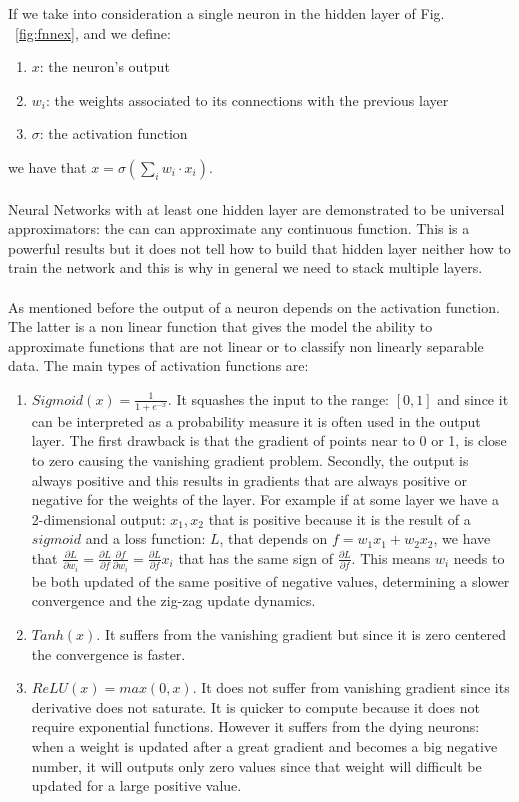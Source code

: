 \documentclass[LaM,binding=0.6cm]{sapthesis}
\begin{document}
If we take into consideration a single neuron in the hidden layer of Fig. ~\ref{fig:fnnex}, and we define:
\begin{enumerate}
\item $x$: the neuron's output 
\item $w_i$: the weights associated to its connections with the previous layer
\item $\sigma$: the activation function
\end{enumerate}
we have that $x=\sigma(\sum_i w_i\cdot x_i)$.\\\\Neural Networks with at least one hidden layer are demonstrated to be universal approximators: the can can approximate any continuous function. This is a powerful results but it does not tell how to build that hidden layer neither how to train the network and this is why in general we need to stack multiple layers.\\\\As mentioned before the output of a neuron depends on the activation function. The latter is a non linear function that gives the model the ability to approximate functions that are not linear or to classify non linearly separable data. The main types of activation functions are:
\begin{enumerate}
\item $Sigmoid(x)=\frac{1}{1+e^{-x}}$. It squashes the input to the range: $[0,1]$ and since it can be interpreted as a probability measure it is often used in the output layer. The first drawback is that the gradient of points near to 0 or 1,  is close to zero causing the vanishing gradient problem. Secondly, the output is always positive and this results in gradients that are always positive or negative for the weights of the layer. For example if at some layer we have a 2-dimensional output: $x_1,x_2$ that is positive because it is the result of a $sigmoid$ and a loss function: $L$, that depends on $f=w_1x_1+w_2x_2$, we have that $\frac{\partial L}{\partial w_i}=\frac{\partial L}{\partial f}\frac{\partial f}{\partial w_i}=\frac{\partial L}{\partial f}x_i$ that has the same sign of $\frac{\partial L}{\partial f}$. This means $w_i$ needs to be both updated of the same positive of negative values, determining a slower convergence and the zig-zag update dynamics.
\item $Tanh(x)$. It suffers from the vanishing gradient but since it is zero centered the convergence is faster.
\item $ReLU(x)=max(0,x)$. It does not suffer from vanishing gradient since its derivative does not saturate. It is quicker to compute because it does not require exponential functions. However it suffers from the dying neurons: when a weight is updated after a great gradient and becomes a big negative number, it will outputs only zero values since that weight will difficult be updated for a large positive value.
\end{enumerate}
\end{document}
